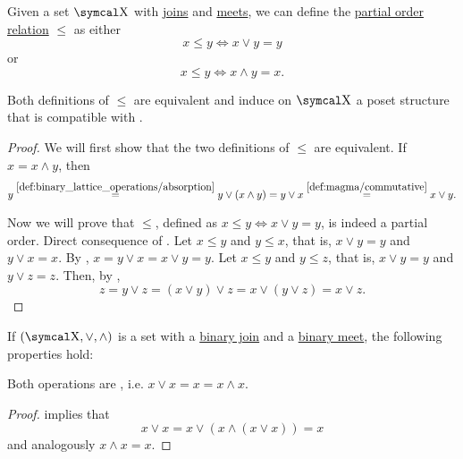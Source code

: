\begin{proposition}\label{thm:binary_lattice_operations_poset}
  Given a set \( \CX \) with \hyperref[def:binary_lattice_operations/join]{joins} and \hyperref[def:binary_lattice_operations/meet]{meets}, we can define the \hyperref[def:poset]{partial order relation} \( \leq \) as either
  \begin{equation*}
    x \leq y \iff x \vee y = y
  \end{equation*}
  or
  \begin{equation*}
    x \leq y \iff x \wedge y = x.
  \end{equation*}

  Both definitions of \( \leq \) are equivalent and induce on \( \CX \) a poset structure that is compatible with .
\end{proposition}
\begin{proof}
  We will first show that the two definitions of \( \leq \) are equivalent. If \( x = x \wedge y \), then
  \begin{equation*}
    y
    \overset {\ref{def:binary_lattice_operations/absorption}} =
    y \vee (x \wedge y)
    =
    y \vee x
    \overset {\ref{def:magma/commutative}} =
    x \vee y.
  \end{equation*}

  Now we will prove that \( \leq \), defined as \( x \leq y \iff x \vee y = y \), is indeed a partial order.
   Direct consequence of .
   Let \( x \leq y \) and \( y \leq x \), that is, \( x \vee y = y \) and \( y \vee x = x \). By , \( x = y \vee x = x \vee y = y \).
   Let \( x \leq y \) and \( y \leq z \), that is, \( x \vee y = y \) and \( y \vee z = z \). Then, by ,
  \begin{equation*}
    z = y \vee z = (x \vee y) \vee z = x \vee (y \vee z) = x \vee z.
  \end{equation*}
\end{proof}

\begin{proposition}\label{thm:binary_lattice_operations_properties}
  If \( (\CX, \vee, \wedge) \) is a set with a \hyperref[def:binary_lattice_operations/join]{binary join} and a \hyperref[def:binary_lattice_operations/meet]{binary meet}, the following properties hold:
  \begin{DefEnum}
     Both operations are , i.e. \( x \vee x = x = x \wedge x \).
  \end{DefEnum}
\end{proposition}
\begin{proof}
    implies that
  \begin{equation*}
    x \vee x = x \vee (x \wedge (x \vee x)) = x
  \end{equation*}
  and analogously \( x \wedge x = x \).
\end{proof}

